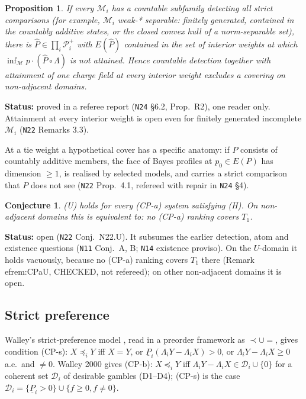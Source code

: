 \documentclass[11pt]{article}
\newtheorem{proposition}[theorem]{Proposition}
\newtheorem{conjecture}[theorem]{Conjecture}
\theoremstyle{definition}
\theoremstyle{remark}
\newcommand{\M}{\mathcal M}
\newcommand{\lp}{\underline{P}}
\newcommand{\src}[1]{\texttt{#1}}
\newcommand{\status}[1]{\par\smallskip\noindent\textbf{Status:} #1\par\smallskip}
\begin{document}
\begin{proposition}\label{prop:CD}
If every $\M_i$ has a countable subfamily detecting all strict comparisons (for example, $\M_i$ weak-* separable: finitely generated, contained in the countably additive states, or the closed convex hull of a norm-separable set), there is $\hat P\in\prod_i\mathcal P^+_i$ with $E(\hat P)$ contained in the set of interior weights at which $\inf_\M p\cdot(\hat P\circ\Lambda)$ is not attained. Hence countable detection together with attainment of one charge field at every interior weight excludes a covering on non-adjacent domains.
\end{proposition}
\status{proved in a referee report (\src{N24} \S6.2, Prop.~R2), one reader only. Attainment at every interior weight is open even for finitely generated incomplete $\M_i$ (\src{N22} Remarks 3.3).}

At a tie weight a hypothetical cover has a specific anatomy: if $P$ consists of countably additive members, the face of Bayes profiles at $p_0\in E(P)$ has dimension $\ge1$, is realised by selected models, and carries a strict comparison that $P$ does not see (\src{N22} Prop.~4.1, refereed with repair in \src{N24} \S4).

\begin{conjecture}\label{conj:U}
(U) holds for every (CP-a) system satisfying (H). On non-adjacent domains this is equivalent to: no (CP-a) ranking covers $T_1$.
\end{conjecture}
\status{open (\src{N22} Conj.~N22.U). It subsumes the earlier detection, atom and existence questions (\src{N11} Conj.~A, B; \src{N14} existence proviso). On the $U$-domain it holds vacuously, because no (CP-a) ranking covers $T_1$ there (Remark~
ef{rem:CPaU}, CHECKED, not refereed); on other non-adjacent domains it is open.}

\subsection{Strict preference}
Walley's strict-preference model \cite[\S\S3.7.7--3.7.9]{W1991}, read in a preorder framework as $\prec\cup{=}$, gives condition (CP-s): $X\preceq_iY$ iff $X=Y$, or $\lp_i(\Lambda_iY-\Lambda_iX)>0$, or $\Lambda_iY-\Lambda_iX\ge0$ a.e.\ and $\ne0$. Walley 2000 \cite[\S6]{W2000} gives (CP-b): $X\preceq_iY$ iff $\Lambda_iY-\Lambda_iX\in\mathcal D_i\cup\{0\}$ for a coherent set $\mathcal D_i$ of desirable gambles (D1--D4); (CP-s) is the case $\mathcal D_i=\{\lp_i>0\}\cup\{f\ge0,f\ne0\}$.
\end{document}
